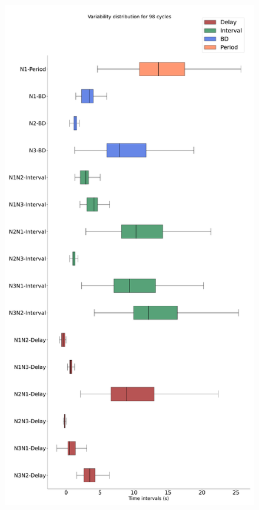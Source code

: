 \begin{figure}[htbp]
\begin{minipage}[b]{0.45\textwidth}
		\includegraphics[width=\textwidth]{./invariants/data/SUSSEX/prep2/images/spontaneous_boxplot.pdf}
	\end{minipage}
	\begin{minipage}[b]{0.53\textwidth}
		\centering

\end{minipage}
\end{figure}
